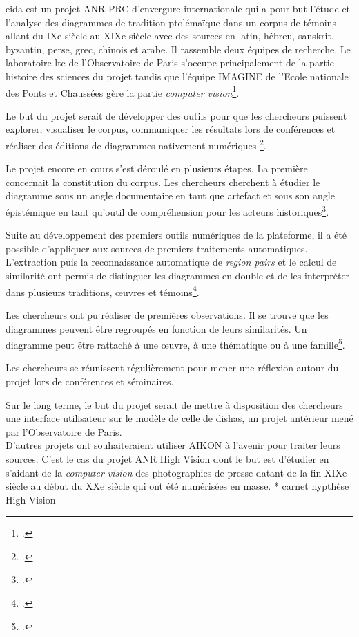 \gls{eida} est un projet ANR PRC d'envergure internationale qui a pour but l'étude et l'analyse des diagrammes de tradition ptolémaïque dans un corpus de témoins allant du IXe siècle au XIXe siècle avec des sources en latin, hébreu, sanskrit, byzantin, perse, grec, chinois et arabe. Il rassemble deux équipes de recherche. Le laboratoire \gls{lte} de l'Observatoire de Paris s'occupe principalement de la partie histoire des sciences du projet tandis que l'équipe IMAGINE de l'Ecole nationale des Ponts et Chaussées gère la partie \textit{computer vision}\footcite{albouyAIKONComputerVision}. 

Le but du projet serait de développer des outils pour que les chercheurs puissent explorer, visualiser le corpus, communiquer les résultats lors de conférences et réaliser des éditions de diagrammes nativement numériques \footcite{Conference2023EIDA2023}.

Le projet encore en cours s'est déroulé en plusieurs étapes. La première concernait la constitution du corpus. Les chercheurs cherchent à étudier le diagramme sous un angle documentaire en tant que artefact et sous son angle épistémique en tant qu'outil de compréhension pour les acteurs historiques\footcite{Conference2023EIDA2023}.

Suite au développement des premiers outils numériques de la plateforme, il a été possible d'appliquer aux sources de premiers traitements automatiques. L'extraction puis la reconnaissance automatique de \textit{region pairs} et le calcul de similarité ont permis de distinguer les diagrammes en double et de les interpréter dans plusieurs traditions, œuvres et témoins\footcite{Conference2024Graphic2024}.

Les chercheurs ont pu réaliser de premières observations. Il se trouve que les diagrammes peuvent être regroupés en fonction de leurs similarités. Un diagramme peut être rattaché à une œuvre, à une thématique ou à une famille\footcite{Conference2025Long2025}. 

Les chercheurs se réunissent régulièrement pour mener une réflexion autour du projet lors de conférences et séminaires. 
 

Sur le long terme, le but du projet serait de mettre à disposition des chercheurs une interface utilisateur sur le modèle de celle de \gls{dishas}, un projet antérieur mené par l'Observatoire de Paris. \\

D'autres projets ont souhaiteraient utiliser AIKON à l'avenir pour traiter leurs sources. C'est le cas du projet ANR High Vision dont le but est d'étudier en s'aidant de la \textit{computer vision} des photographies de presse datant de la fin XIXe siècle au début du XXe siècle qui ont été numérisées en masse. * carnet hypthèse High Vision



 